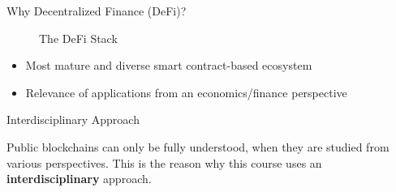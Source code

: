 \documentclass[handout]{beamer}
\begin{document}
\fi


\begin{frame}{Why Decentralized Finance (DeFi)?}

\begin{figure}[t]
	\centering	
	\resizebox{0.8\textwidth}{!}{
	\begin{tikzpicture}[scale=1.0, every node/.style={scale=1.0}]
			
	\end{tikzpicture}}
	\caption{The DeFi Stack \cite{FS:21}}
\end{figure}

\vspace{-1.0em}

\begin{itemize}
	\item Most mature and diverse smart contract-based ecosystem
	\item Relevance of applications from an economics/finance perspective
\end{itemize}

\end{frame}

\begin{frame}{Interdisciplinary Approach}

	\vspace{1em}
Public blockchains can only be fully understood, when they are studied from various perspectives. This is the reason why this course uses an \color{focus} \textbf{interdisciplinary} \color{black} approach.	


\end{frame}
\end{document}
